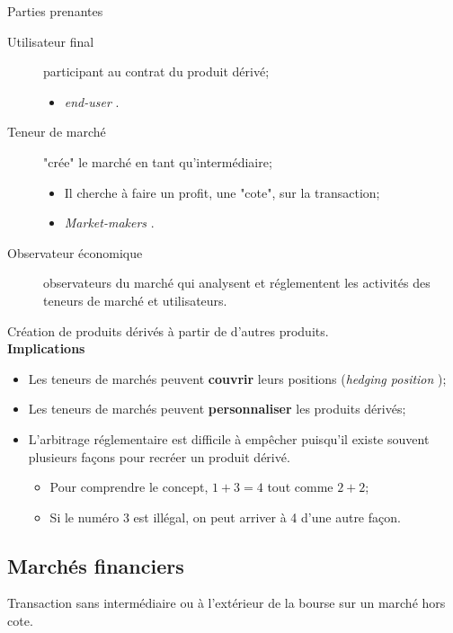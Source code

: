 \documentclass[10pt, french]{article}
\begin{document}
\begin{multicols*}{2}
\begin{conceptgen}{Parties prenantes}
\begin{description}
	\item[Utilisateur final]	participant au contrat du produit dérivé;
		\begin{itemize}
		\item	\og \textit{end-user} \fg{}.
		\end{itemize}
	\item[\hypertarget{market_holder}{Teneur de marché}]	"crée" le marché en tant qu'intermédiaire;
		\begin{itemize}[leftmargin = *]
		\item	Il cherche à faire un profit, une "cote", sur la transaction;
		\item	\og \textit{Market-makers} \fg{}.
		\end{itemize}
	\item[Observateur économique]	observateurs du marché qui analysent et réglementent les activités des teneurs de marché et utilisateurs.
\end{description}
\end{conceptgen}

\begin{definitionNOHFILL} 
Création de produits dérivés à partir de d'autres produits.\\

\textbf{Implications}
\begin{itemize}[leftmargin = *]
	\item	Les teneurs de marchés peuvent \textbf{couvrir} leurs positions (\og \textit{hedging position} \fg{});
	\item	Les teneurs de marchés peuvent \textbf{personnaliser} les produits dérivés;
	\item	L'arbitrage réglementaire est difficile à empêcher puisqu'il existe souvent plusieurs façons pour recréer un produit dérivé.
		\begin{itemize}[leftmargin = *]
		\item	Pour comprendre le concept, $1 + 3 = 4$ tout comme $2 + 2$;
		\item	Si le numéro 3 est illégal, on peut arriver à 4 d'une autre façon.
		\end{itemize}		 
\end{itemize}
\end{definitionNOHFILL}

\columnbreak

\subsection*{Marchés financiers}
\begin{definitionNOHFILL} 
Transaction sans intermédiaire ou à l'extérieur de la bourse sur un marché hors cote. 


\end{definitionNOHFILL}
\end{multicols*}
\end{document}
